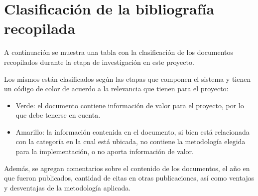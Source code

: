 \chapter{Clasificación de la bibliografía recopilada}
\label{tablabiblio}
A continuación se muestra una tabla con la clasificación de los documentos recopilados durante la etapa de investigación en este proyecto.

Los mismos están clasificados según las etapas que componen el sistema y tienen un código de color de acuerdo a la relevancia que tienen para el proyecto:
\begin{itemize}
	\item Verde: el documento contiene información de valor para el proyecto, por lo que debe tenerse en cuenta.
	\item Amarillo: la información contenida en el documento, si bien está relacionada con la categoría en la cual está ubicada, no contiene la metodología elegida para la implementación, o no aporta información de valor. 
\end{itemize}

Además, se agregan comentarios sobre el contenido de los documentos, el año en que fueron publicados, cantidad de citas en otras publicaciones, así como ventajas y desventajas de la metodología aplicada.


